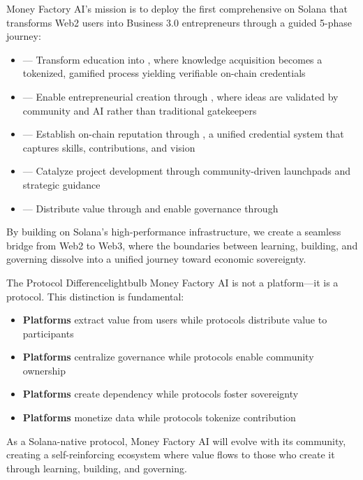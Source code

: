 Money Factory AI's mission is to deploy the first comprehensive  on Solana that transforms Web2 users into Business 3.0 entrepreneurs through a guided 5-phase journey:

\begin{itemize}
    \item {} — Transform education into , where knowledge acquisition becomes a tokenized, gamified process yielding verifiable on-chain credentials
    
    \item {} — Enable entrepreneurial creation through , where ideas are validated by community and AI rather than traditional gatekeepers
    
    \item {} — Establish on-chain reputation through , a unified credential system that captures skills, contributions, and vision
    
    \item {} — Catalyze project development through community-driven launchpads and  strategic guidance
    
    \item {} — Distribute value through  and enable governance through 
\end{itemize}

By building on Solana's high-performance infrastructure, we create a seamless bridge from Web2 to Web3, where the boundaries between learning, building, and governing dissolve into a unified journey toward economic sovereignty.

\begin{mfai-box}{The Protocol Difference}{lightbulb}
Money Factory AI is not a platform—it is a protocol. This distinction is fundamental:

\begin{itemize}
    \item \textbf{Platforms} extract value from users while protocols distribute value to participants
    \item \textbf{Platforms} centralize governance while protocols enable community ownership
    \item \textbf{Platforms} create dependency while protocols foster sovereignty
    \item \textbf{Platforms} monetize data while protocols tokenize contribution
\end{itemize}

As a Solana-native protocol, Money Factory AI will evolve with its community, creating a self-reinforcing ecosystem where value flows to those who create it through learning, building, and governing.
\end{mfai-box}

